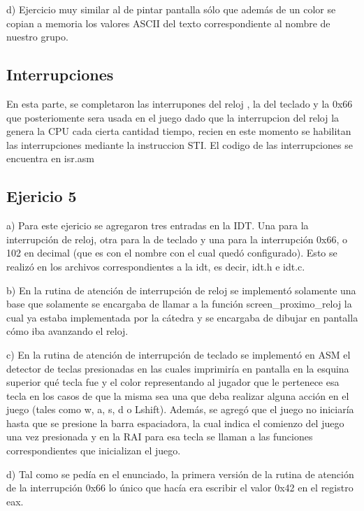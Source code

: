 \documentclass[a4paper]{article}
\begin{document}
d) Ejercicio muy similar al de pintar pantalla sólo que además de un color se copian a memoria los valores ASCII del texto correspondiente al nombre de nuestro grupo.


\subsection{Interrupciones}
En esta parte, se completaron las interrupones del reloj , la del teclado y la 0x66 que posteriomente sera usada en el juego
dado que la interrupcion del reloj la genera la CPU cada cierta cantidad tiempo, recien en este momento se habilitan las interrupciones mediante la instruccion STI.
El codigo de las interrupciones se encuentra en isr.asm 

\subsection{Ejericio 5}

a) Para este ejericio se agregaron tres entradas en la IDT. Una para la interrupción de reloj, otra para la de teclado y una para la interrupción 0x66, o 102 en decimal (que es con el nombre con el cual quedó configurado).
Esto se realizó en los archivos correspondientes a la idt, es decir, idt.h e idt.c.

b) En la rutina de atención de interrupción de reloj se implementó solamente una base que solamente se encargaba de llamar a la función screen_proximo_reloj la
cual ya estaba implementada por la cátedra y se encargaba de dibujar en pantalla cómo iba avanzando el reloj.

c) En la rutina de atención de interrupción de teclado se implementó en ASM el detector de teclas presionadas en las cuales imprimiría en pantalla en la esquina
superior qué tecla fue y el color representando al jugador que le pertenece esa tecla en los casos de que la misma sea una que deba realizar alguna acción en el juego
(tales como w, a, s, d o Lshift). Además, se agregó que el juego no iniciaría hasta que se presione la barra espaciadora, la cual indica el comienzo del juego una vez presionada
y en la RAI para esa tecla se llaman a las funciones correspondientes que inicializan el juego.

d) Tal como se pedía en el enunciado, la primera versión de la rutina de atención de la interrupción 0x66 lo único que hacía era escribir el valor 0x42 en el registro eax.
\end{document}
